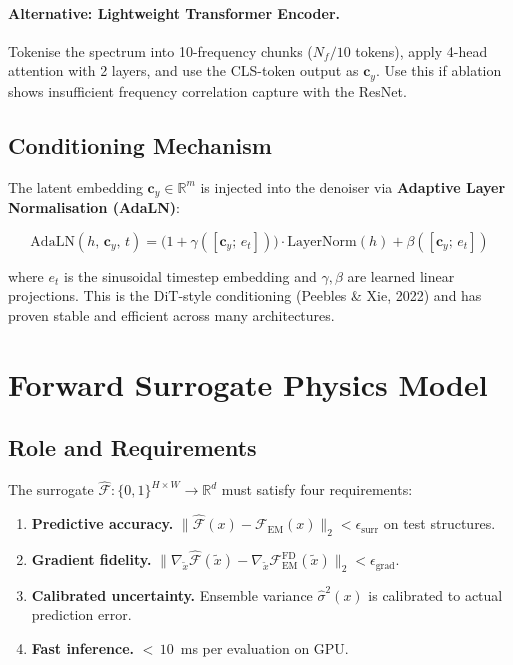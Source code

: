 \documentclass[12pt,a4paper]{article}
\newcommand{\FEM}{\mathcal{F}_{\mathrm{EM}}}
\newcommand{\xtilde}{\tilde{x}}
\newcommand{\cy}{\mathbf{c}_y}
\newcommand{\HW}{H \times W}
\newcommand{\sigmahat}{\hat{\sigma}}
\theoremstyle{definition}
\theoremstyle{plain}
\theoremstyle{remark}
\begin{document}
\paragraph{Alternative: Lightweight Transformer Encoder.}
Tokenise the spectrum into 10-frequency chunks ($N_f/10$ tokens), apply 4-head
attention with 2 layers, and use the CLS-token output as $\cy$.
Use this if ablation shows insufficient frequency correlation capture with the ResNet.

\subsection{Conditioning Mechanism}

The latent embedding $\cy \in \mathbb{R}^m$ is injected into the denoiser via
\textbf{Adaptive Layer Normalisation (AdaLN)}:

\begin{equation}
  \mathrm{AdaLN}(h,\, \cy,\, t)
  = \bigl(1 + \gamma([\cy;\, e_t])\bigr)
    \cdot \mathrm{LayerNorm}(h)
    + \beta([\cy;\, e_t])
  \label{eq:adaLN}
\end{equation}

where $e_t$ is the sinusoidal timestep embedding and $\gamma, \beta$ are learned linear
projections.
This is the DiT-style conditioning (Peebles \& Xie, 2022) and has proven stable
and efficient across many architectures.

\section{Forward Surrogate Physics Model}
\label{sec:surrogate}

\subsection{Role and Requirements}

The surrogate $\hat{\mathcal{F}} : \{0,1\}^{\HW} \to \mathbb{R}^d$ must satisfy four
requirements:

\begin{enumerate}
  \item \textbf{Predictive accuracy.}
        $\|\hat{\mathcal{F}}(x) - \FEM(x)\|_2 < \epsilon_{\mathrm{surr}}$ on test structures.
  \item \textbf{Gradient fidelity.}
        $\|\nabla_{\xtilde}\hat{\mathcal{F}}(\xtilde) -
           \nabla_{\xtilde}\FEM^{\mathrm{FD}}(\xtilde)\|_2 < \epsilon_{\mathrm{grad}}$.
  \item \textbf{Calibrated uncertainty.}
        Ensemble variance $\sigmahat^2(x)$ is calibrated to actual prediction error.
  \item \textbf{Fast inference.}
        ${<}\,10$~ms per evaluation on GPU.
\end{enumerate}
\end{document}
